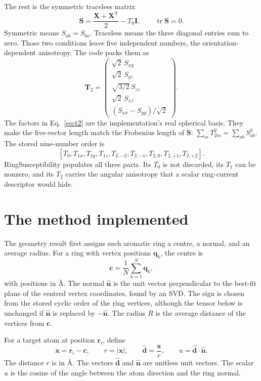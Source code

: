 \documentclass[11pt]{article}
\begin{document}
The rest is the symmetric traceless matrix
\begin{equation}
  \bm S =
  \frac{\bm X+\bm X^{\mathsf T}}{2} - T_0\bm I,
  \qquad \operatorname{tr}\bm S=0 .
  \label{eq:symtr}
\end{equation}
Symmetric means \(S_{ab}=S_{ba}\). Traceless means the three diagonal entries
sum to zero. Those two conditions leave five independent numbers, the
orientation-dependent anisotropy. The code packs them as
\begin{equation}
  \bm T_2 =
  \begin{pmatrix}
    \sqrt{2}\,S_{xy}\\
    \sqrt{2}\,S_{yz}\\
    \sqrt{3/2}\,S_{zz}\\
    \sqrt{2}\,S_{xz}\\
    (S_{xx}-S_{yy})/\sqrt{2}
  \end{pmatrix}.
  \label{eq:t2}
\end{equation}
The factors in Eq.~\eqref{eq:t2} are the implementation's real spherical basis.
They make the five-vector length match the Frobenius length of
\(\bm S\): \(\sum_m T_{2m}^2=\sum_{ab}S_{ab}^2\). The stored nine-number order is
\[
  [T_0,T_{1x},T_{1y},T_{1z},
    T_{2,-2},T_{2,-1},T_{2,0},T_{2,+1},T_{2,+2}] .
\]
RingSusceptibility populates all three parts. Its \(T_0\) is not discarded, its
\(T_1\) can be nonzero, and its \(T_2\) carries the angular anisotropy that a
scalar ring-current descriptor would hide.

\section{The method implemented}

The geometry result first assigns each aromatic ring a centre, a normal, and an
average radius. For a ring with vertex positions \(\bm q_k\), the centre is
\begin{equation}
  \bm c = \frac{1}{N}\sum_{k=1}^{N}\bm q_k ,
  \label{eq:center}
\end{equation}
with positions in \(\si{\angstrom}\). The normal \(\hat{\bm n}\) is the unit
vector perpendicular to the best-fit plane of the centred vertex coordinates,
found by an SVD. The sign is chosen from the stored cyclic order of the ring
vertices, although the tensor below is unchanged if \(\hat{\bm n}\) is replaced
by \(-\hat{\bm n}\). The radius \(R\) is the average distance of the vertices
from \(\bm c\).

For a target atom at position \(\bm r_i\), define
\begin{equation}
  \bm x = \bm r_i-\bm c,\qquad
  r = |\bm x|,\qquad
  \hat{\bm d} = \frac{\bm x}{r},\qquad
  u = \hat{\bm d}\cdot\hat{\bm n}.
  \label{eq:ring-geometry}
\end{equation}
The distance \(r\) is in \(\si{\angstrom}\). The vectors \(\hat{\bm d}\) and
\(\hat{\bm n}\) are unitless unit vectors. The scalar \(u\) is the cosine of the
angle between the atom direction and the ring normal.
\end{document}
